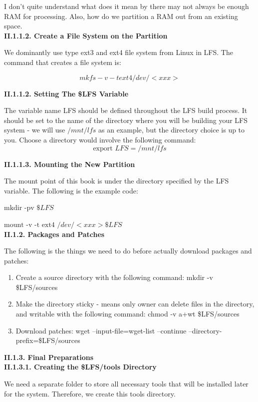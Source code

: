 \documentclass[a4paper,12pt]{report}
\begin{document}
\noindent
I don't quite understand what does it mean by there may not always be enough RAM for processing. Also, how do we partition a RAM out from an existing space.\\

\noindent
\textbf{II.1.1.2. Create a File System on the Partition}

\noindent
We dominantly use type ext3 and ext4 file system from Linux in LFS. The command that creates a file system is: 

\[mkfs -v -t ext4 /dev/<xxx>\]

\noindent
\textbf{II.1.1.2. Setting The \$LFS Variable}

\noindent
The variable name LFS should be defined throughout the LFS build process. It should be set to the name of the directory where you will be building your LFS system - we will use  \(/mnt/lfs\) as an example, but the directory choice is up to you. Choose a directory would involve the following command:
\[\text{export } LFS=/mnt/lfs\]

\noindent
\textbf{II.1.1.3. Mounting the New Partition}

\noindent
The mount point of this book is under the directory specified by the LFS variable. The following is the example code:

\noindent
\(\text{mkdir -pv } \$LFS\)

\noindent
\(\text{mount -v -t ext4 } /dev/<xxx>\$LFS\)\\

\noindent
\textbf{II.1.2. Packages and Patches}

\noindent
The following is the things we need to do before actually download packages and patches:
\begin{enumerate}
\item Create a source directory with the following command: mkdir -v \$LFS/sources
\item Make the directory sticky - means only owner can delete files in the directory, and writable with the following command: chmod -v a+wt \$LFS/sources
\item Download patches: wget --input-file=wget-list --continue --directory-prefix=\$LFS/sources 
\end{enumerate}

\noindent
\textbf{II.1.3. Final Preparations}\\

\noindent
\textbf{II.1.3.1. Creating the \$LFS/tools Directory}

\noindent
We need a separate folder to store all necessary tools that will be installed later for the system. Therefore, we create this tools directory. 
\end{document}
